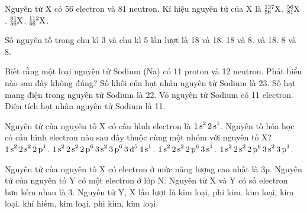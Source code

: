 \documentclass[11pt,a4paper]{article}
\begin{document}
\begin{ex}
Nguyên tử X có 56 electron và 81 neutron. Kí hiệu nguyên tử của X là
\choice
{\True $^{137}_{56}\ce{X}$.}
{$^{56}_{81}\ce{X}$.}
{$^{81}_{56}\ce{X}$.}
{$^{112}_{56}\ce{X}$.}

\end{ex}
\begin{ex}
Số nguyên tố trong chu kì 3 và chu kì 5 lần lượt là
\choice
{18 và 18.}
{18 và 8.}
{ và 18.}
{8 và 8.}

\end{ex}
\begin{ex}
Biết rằng một loại nguyên tử Sodium (Na) có 11 proton và 12 neutron. Phát biểu nào sau đây không đúng?
\choice
{Số khối của hạt nhân nguyên tử Sodium là 23.}
{Số hạt mang điện trong nguyên tử Sodium là 22.}
{Vỏ nguyên tử Sodium có 11 electron.}
{\True Điện tích hạt nhân nguyên tử Sodium là 11.}

\end{ex}
\begin{ex}
Nguyên tử của nguyên tố X có cấu hình electron là $\ce{1s^2 2s^1}$. Nguyên tố hóa học có cấu hình electron nào sau đây thuộc cùng một nhóm với nguyên tố X?
\choice
{$\ce{1s^2 2s^2 2p^1}$.}
{$\ce{1s^2 2s^2 2p^6 3s^2 3p^6 3d^5 4s^1}$.}
{\True $\ce{1s^2 2s^2 2p^6 3s^1}$.}
{$\ce{1s^2 2s^2 2p^6 3s^2 3p^1}$.}

\end{ex}
\begin{ex}
Nguyên tử của nguyên tố X có electron ở mức năng lượng cao nhất là 3p. Nguyên tử của nguyên tố Y có một electron ở lớp N. Nguyên tử X và Y có số electron hơn kém nhau là 3. Nguyên tử Y, X lần lượt là
\choice
{\True kim loại, phi kim.}
{kim loại, kim loại.}
{khí hiếm, kim loại.}
{phi kim, kim loại.}

\end{ex}
\end{document}
